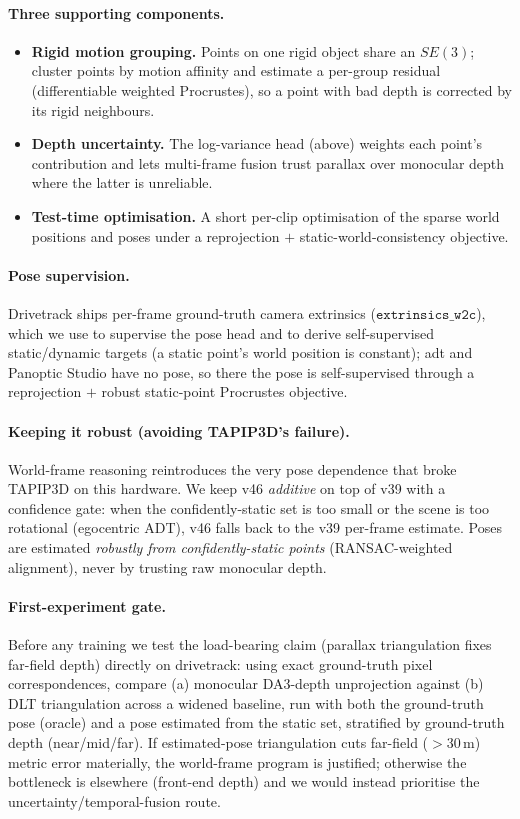 \documentclass[11pt,a4paper]{article}
\begin{document}
\paragraph{Three supporting components.}
\begin{itemize}
  \item \textbf{Rigid motion grouping.} Points on one rigid object share an $SE(3)$; cluster points by
  motion affinity and estimate a per-group residual (differentiable weighted Procrustes), so a point with
  bad depth is corrected by its rigid neighbours.
  \item \textbf{Depth uncertainty.} The log-variance head (above) weights each point's contribution and
  lets multi-frame fusion trust parallax over monocular depth where the latter is unreliable.
  \item \textbf{Test-time optimisation.} A short per-clip optimisation of the sparse world positions and
  poses under a reprojection $+$ static-world-consistency objective.
\end{itemize}

\paragraph{Pose supervision.}
Drivetrack ships per-frame ground-truth camera extrinsics ($\texttt{extrinsics\_w2c}$), which we use to
supervise the pose head and to derive self-supervised static/dynamic targets (a static point's world
position is constant); adt and Panoptic Studio have no pose, so there the pose is self-supervised through a
reprojection $+$ robust static-point Procrustes objective.

\paragraph{Keeping it robust (avoiding TAPIP3D's failure).}
World-frame reasoning reintroduces the very pose dependence that broke TAPIP3D on this hardware. We keep
v46 \emph{additive} on top of v39 with a confidence gate: when the confidently-static set is too small
or the scene is too rotational (egocentric ADT), v46 falls back to the v39 per-frame estimate. Poses are
estimated \emph{robustly from confidently-static points} (RANSAC-weighted alignment), never by trusting raw
monocular depth.

\paragraph{First-experiment gate.}
\label{sec:v46-gate}
Before any training we test the load-bearing claim (parallax triangulation fixes far-field depth) directly
on drivetrack: using exact ground-truth pixel correspondences, compare (a) monocular DA3-depth unprojection
against (b) DLT triangulation across a widened baseline, run with both the ground-truth pose (oracle) and a
pose estimated from the static set, stratified by ground-truth depth (near/mid/far). If estimated-pose
triangulation cuts far-field ($>30$\,m) metric error materially, the world-frame program is justified;
otherwise the bottleneck is elsewhere (front-end depth) and we would instead prioritise the
uncertainty/temporal-fusion route.
\end{document}
